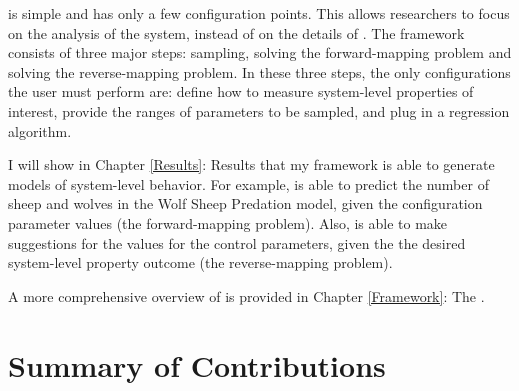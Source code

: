 \fw is simple and has only a few configuration points.
This allows researchers to focus on the analysis of the system, instead of on the details of \fw.
The framework consists of three major steps: sampling, solving the forward-mapping problem and solving the reverse-mapping problem.
In these three steps, the only configurations the user must perform are: define how to measure system-level properties of interest, provide the ranges of parameters to be sampled, and plug in a regression algorithm.

I will show in Chapter \ref{Results}: Results that my framework is able to generate models of system-level behavior.
For example, \fw is able to predict the number of sheep and wolves in the Wolf Sheep Predation model, given the configuration parameter values (the forward-mapping problem).
Also, \fw is able to make suggestions for the values for the control parameters, given the the desired system-level property outcome (the reverse-mapping problem).

A more comprehensive overview of \fw is provided in Chapter \ref{Framework}: The \framework.



\section{Summary of Contributions}


